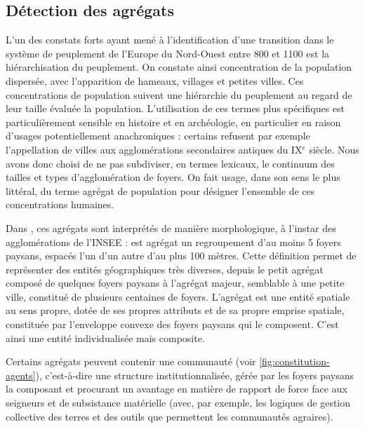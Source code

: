 \subsection{Détection des agrégats \label{meca-agregats}}

L'un des constats forts ayant mené à l'identification d'une \og transition\fg{} \autocite{pumain_convergences_2017, nuninger_cadre_2017} dans le système de peuplement de l'Europe du Nord-Ouest entre 800 et 1100 est la hiérarchisation du peuplement.
On constate ainsi concentration de la population dispersée, avec l'apparition de hameaux, villages et petites villes.
Ces concentrations de population suivent une hiérarchie du peuplement au regard de leur taille évaluée la population.
L'utilisation de ces termes plus spécifiques est particulièrement sensible en histoire et en archéologie, en particulier en raison d'usages potentiellement anachroniques : certains refusent par exemple l'appellation de villes aux agglomérations secondaires antiques du IX$^e$ siècle.
Nous avons donc choisi de ne pas subdiviser, en termes lexicaux, le continuum des tailles et types d'agglomération de foyers.
On fait usage, dans son sens le plus littéral, du terme \og agrégat\fg{} de population pour désigner l'ensemble de ces concentrations humaines.

\begin{tcolorbox}[breakable,left=0pt,right=0pt,top=0pt,bottom=0pt,
	colback=gray!15,colframe=gray!15,width=\dimexpr\textwidth\relax, 
	enlarge left by=0mm, boxsep=5pt,arc=0pt,outer arc=0pt]

Dans \simfeodal{}, ces agrégats sont interprétés de manière morphologique, à l'instar des agglomérations de l'INSEE : est agrégat un regroupement d'au moins 5 foyers paysans, espacés l'un d'un autre d'au plus 100 mètres.
Cette définition permet de représenter des entités géographiques très diverses, depuis le petit agrégat composé de quelques foyers paysans à l'agrégat majeur, semblable à une petite ville, constitué de plusieurs centaines de foyers.
L'agrégat est une entité spatiale au sens propre, dotée de ses propres attributs et de sa propre emprise spatiale, constituée par l'enveloppe convexe des foyers paysans qui le composent.
C'est ainsi une entité individualisée mais composite.
\end{tcolorbox}

Certains agrégats peuvent contenir une \og communauté\fg{} (voir \cref{fig:constitution-agents}), c'est-à-dire une structure institutionnalisée, gérée par les foyers paysans la composant et procurant un avantage en matière de rapport de force face aux seigneurs et de subsistance matérielle (avec, par exemple, les logiques de gestion collective des terres et des outils que permettent les communautés agraires).

